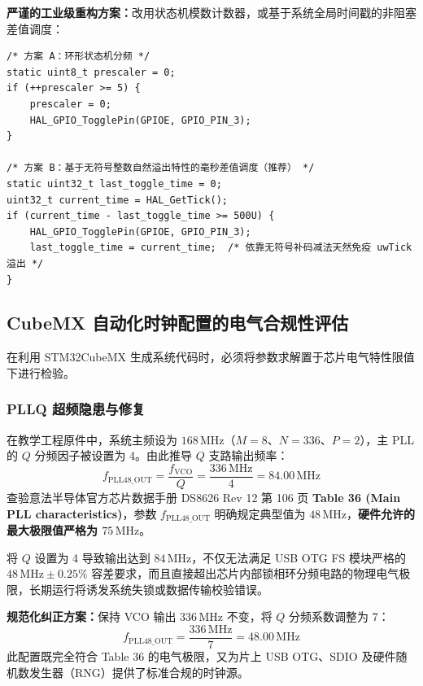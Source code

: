 \documentclass[11pt,a4paper]{ctexart}
\begin{document}
\textbf{严谨的工业级重构方案：}改用状态机模数计数器，或基于系统全局时间戳的非阻塞差值调度：
\begin{lstlisting}[style=cstyle]
/* 方案 A：环形状态机分频 */
static uint8_t prescaler = 0;
if (++prescaler >= 5) {
    prescaler = 0;
    HAL_GPIO_TogglePin(GPIOE, GPIO_PIN_3);
}

/* 方案 B：基于无符号整数自然溢出特性的毫秒差值调度（推荐） */
static uint32_t last_toggle_time = 0;
uint32_t current_time = HAL_GetTick();
if (current_time - last_toggle_time >= 500U) {
    HAL_GPIO_TogglePin(GPIOE, GPIO_PIN_3);
    last_toggle_time = current_time;  /* 依靠无符号补码减法天然免疫 uwTick 溢出 */
}
\end{lstlisting}

\subsection{CubeMX 自动化时钟配置的电气合规性评估}
在利用 STM32CubeMX 生成系统代码时，必须将参数求解置于芯片电气特性限值下进行检验。

\subsubsection*{PLLQ 超频隐患与修复}
在教学工程原件中，系统主频设为 $168\,\mathrm{MHz}$（$M=8$、$N=336$、$P=2$），主 PLL 的 $Q$ 分频因子被设置为 4。由此推导 $Q$ 支路输出频率：
\begin{equation}
f_{\mathrm{PLL48\_OUT}} = \frac{f_{\mathrm{VCO}}}{Q} = \frac{336\,\mathrm{MHz}}{4} = 84.00\,\mathrm{MHz}
\end{equation}
查验意法半导体官方芯片数据手册 DS8626 Rev 12 第 106 页 \textbf{Table 36 (Main PLL characteristics)}，参数 $f_{\mathrm{PLL48\_OUT}}$ 明确规定典型值为 $48\,\mathrm{MHz}$，\textbf{硬件允许的最大极限值严格为 $75\,\mathrm{MHz}$}。

将 $Q$ 设置为 4 导致输出达到 $84\,\mathrm{MHz}$，不仅无法满足 USB OTG FS 模块严格的 $48\,\mathrm{MHz}\pm0.25\%$ 容差要求，而且直接超出芯片内部锁相环分频电路的物理电气极限，长期运行将诱发系统失锁或数据传输校验错误。

\textbf{规范化纠正方案：}保持 VCO 输出 $336\,\mathrm{MHz}$ 不变，将 $Q$ 分频系数调整为 7：
\begin{equation}
f_{\mathrm{PLL48\_OUT}} = \frac{336\,\mathrm{MHz}}{7} = 48.00\,\mathrm{MHz}
\end{equation}
此配置既完全符合 Table 36 的电气极限，又为片上 USB OTG、SDIO 及硬件随机数发生器（RNG）提供了标准合规的时钟源。
\end{document}
